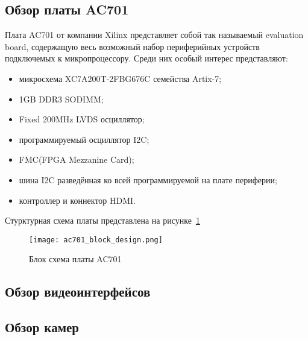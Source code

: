 \subsection{Обзор платы AC701}
\label{sub:domain:ac701}

Плата AC701 от компании Xilinx представляет собой так называемый evaluation board,
содержащую весь возможный набор периферийных устройств подключемых к микропроцессору.
Среди них особый интерес представляют:
\begin{itemize}
  \item микросхема XC7A200T-2FBG676C семейства Artix-7;
  \item 1GB DDR3 SODIMM;
  \item Fixed 200MHz LVDS осциллятор;
  \item программируемый осциллятор I2C;
  \item FMC(FPGA Mezzanine Card);
  \item шина I2C разведённая ко всей программируемой на плате периферии;
  \item контроллер и коннектор HDMI.
\end{itemize}

Стурктурная схема платы представлена на рисунке~\ref{fig:domain:ac701:block_design}

\begin{figure}[ht]
  \centering
  \texttt{[image: ac701\_block\_design.png]}
  \caption{ Блок схема платы AC701 }
  \label{fig:domain:ac701:block_design}
\end{figure}


\subsection{Обзор видеоинтерфейсов}
\label{sub:domain:videointerfaces}



\subsection{Обзор камер}
\label{sub:domain:camera}


